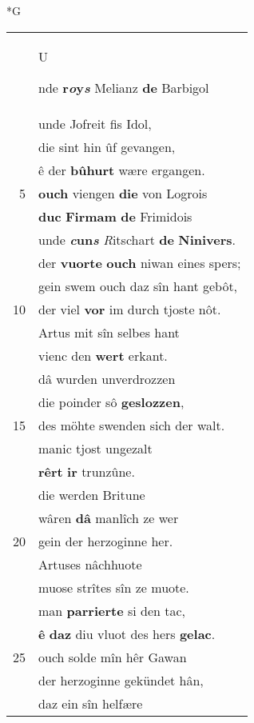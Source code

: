 \documentclass[8pt,a4paper,notitlepage]{article}
\begin{document}
\begin{table}[ht]
\begin{minipage}[t]{0.5\linewidth}
\small
\begin{center}*G
\end{center}
\begin{tabular}{rl}
 & \begin{large}U\end{large}nde \textbf{r\textit{o}y\textit{s}} Melianz \textbf{de} Barbigol\\ 
 & unde Jofreit fis Idol,\\ 
 & die sint hin ûf gevangen,\\ 
 & ê der \textbf{bûhurt} wære ergangen.\\ 
5 & \textbf{ouch} viengen \textbf{die} von Logrois\\ 
 & \textbf{duc} \textbf{Firmam} \textbf{de} Frimidois\\ 
 & unde \textbf{\textit{c}un\textit{s}} \textit{R}itschart \textbf{de} \textbf{Ninivers}.\\ 
 & der \textbf{vuorte} \textbf{ouch} niwan eines spers;\\ 
 & gein swem ouch daz sîn hant gebôt,\\ 
10 & der viel \textbf{vor} im durch tjoste nôt.\\ 
 & Artus mit sîn selbes hant\\ 
 & vienc den \textbf{wert} erkant.\\ 
 & dâ wurden unverdrozzen\\ 
 & die poinder sô \textbf{geslozzen},\\ 
15 & des möhte swenden sich der walt.\\ 
 & manic tjost ungezalt\\ 
 & \textbf{rêrt} \textbf{ir} trunzûne.\\ 
 & die werden Britune\\ 
 & wâren \textbf{dâ} manlîch ze wer\\ 
20 & gein der herzoginne her.\\ 
 & Artuses nâchhuote\\ 
 & muose strîtes sîn ze muote.\\ 
 & man \textbf{parrierte} si den tac,\\ 
 & \textbf{ê} \textbf{daz} diu vluot des hers \textbf{gelac}.\\ 
25 & ouch solde mîn hêr Gawan\\ 
 & der herzoginne gekündet hân,\\ 
 & daz ein sîn helfære\\ 

\end{tabular}
\end{minipage}
\end{table}
\end{document}

